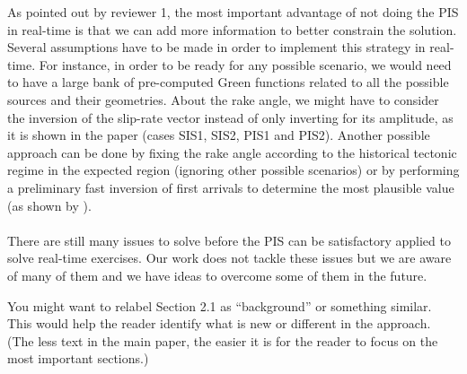 \documentclass[10pt]{extarticle}
\begin{document}
\begin{Answer}
As pointed out by reviewer 1, the most important advantage of not doing the PIS in real-time
is that we can add more information to better constrain the solution. Several 
assumptions have to be made in order to implement this strategy in real-time. For instance, 
in order to be ready for any possible scenario, we would need to have a large bank of pre-computed 
Green functions related to all the possible sources and their geometries. About the rake angle, 
we might have to consider the inversion of the slip-rate vector instead of only inverting for 
its amplitude, as it is shown in the paper (cases SIS1, SIS2, PIS1 and PIS2). Another possible 
approach can be done by fixing the rake angle according to the historical tectonic regime in the 
expected region (ignoring other possible scenarios) or by performing a preliminary fast 
inversion of first arrivals to determine the most plausible value (as shown by \cite{Pacheco_1998_SPT}). \\
%
\\
There are still many issues to solve before the PIS can be satisfactory
applied to solve real-time exercises. Our work does not tackle these issues 
but we are aware of many of them and we have ideas to overcome some of 
them in the future.
 \WorkInProgressRevTask
\end{Answer}
%
%
\begin{ReviewerComment}{1}
\noindent 
 You might want to relabel Section 2.1 as “background” or something similar. This would
 help the reader identify what is new or different in the approach. (The less text in the main
 paper, the easier it is for the reader to focus on the most important sections.)
\end{ReviewerComment}
%
\end{document}

